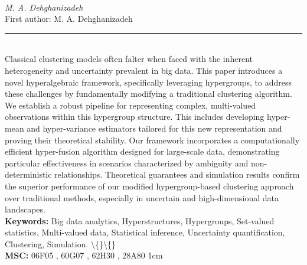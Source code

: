 \documentclass[10pt,twoside]{article}
\begin{document}
\noindent\begin{minipage}[t][\textheight]{\textwidth}
\\[0.35em]
{\itshape M. A. Dehghanizadeh}\\[0.2em]
{\footnotesize First author: M. A. Dehghanizadeh}\\[0.45em]
\noindent\rule{\textwidth}{0.3pt}\\[0.4em]
{\footnotesize  Classical clustering models often falter when faced with the inherent heterogeneity and uncertainty prevalent in big data. This paper introduces a novel hyperalgebraic framework, specifically leveraging hypergroups, to address these challenges by fundamentally modifying a traditional clustering algorithm. We establish a robust pipeline for representing complex, multi-valued observations within this hypergroup structure. This includes developing hyper-mean and hyper-variance estimators tailored for this new representation and proving their theoretical stability. Our framework incorporates a computationally efficient hyper-fusion algorithm designed for large-scale data, demonstrating particular effectiveness in scenarios characterized by ambiguity and non-deterministic relationships. Theoretical guarantees and simulation results confirm the superior performance of our modified hypergroup-based clustering approach over traditional methods, especially in uncertain and high-dimensional data landscapes.}\\[0.4em]
{\footnotesize\bfseries Keywords:} {\footnotesize Big data analytics, Hyperstructures, Hypergroups, Set-valued statistics, Multi-valued data, Statistical inference, Uncertainty quantification, Clustering, Simulation. \textbackslash\{\}\textbackslash\{\}}\\[0.15em]
{\footnotesize\bfseries MSC:} {\footnotesize 06F05 , 60G07 , 62H30 , 28A80 1cm}\\
\vfill
\end{minipage}
\newpage
\end{document}
